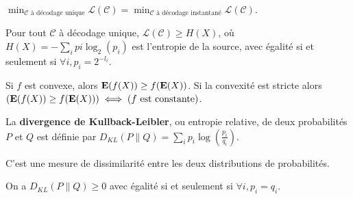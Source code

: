 \begin{cor}
	$\min_{\mathcal{C} \text{ à décodage unique}} \mathcal{L}(\mathcal{C}) = \min_{\mathcal{C} \text{ à décodage instantané}} \mathcal{L}(\mathcal{C})$.
\end{cor}

\begin{thm}
	Pour tout $\mathcal{C}$ à décodage unique, $\mathcal{L}(\mathcal{C}) \geq H(X)$, où $H(X) = - \sum_i pi \log_2(p_i)$ est l'entropie de la source, avec égalité si et seulement si $\forall i, p_i = 2^{-l_i}$.
\end{thm}

\begin{thm}
	Si $f$ est convexe, alors $\mathbf{E}(f(X)) \geq f(\mathbf{E}(X))$.
	Si la convexité est stricte alors $\left( \mathbf{E}(f(X)) \geq f(\mathbf{E}(X)) \right) \iff \left( f \text{ est constante}\right)$.
\end{thm}

\begin{defn}
	La \textbf{divergence de Kullback-Leibler}, ou entropie relative, de deux probabilités $P$ et $Q$ est définie par $D_{KL}(P \| Q) = \sum_i p_i \log \left( \frac{p_i}{q_i} \right)$.
\end{defn}

C'est une mesure de dissimilarité entre les deux distributions de probabilités.

\begin{cor}
	On a $D_{KL}(P \| Q) \geq 0$ avec égalité si et seulement si $\forall i, p_i = q_i$.
\end{cor}

